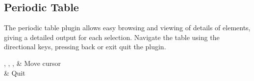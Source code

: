 \subsection{Periodic Table}

The periodic table plugin allows easy browsing and viewing of details of elements, giving a detailed output for each selection. Navigate the table using the directional keys, pressing back or exit quit the plugin.

\begin{btnmap}
  \PluginUp, \PluginDown, \PluginLeft, \PluginRight
  & Move cursor\\

  \PluginCancel
  & Quit\\
\end{btnmap}
